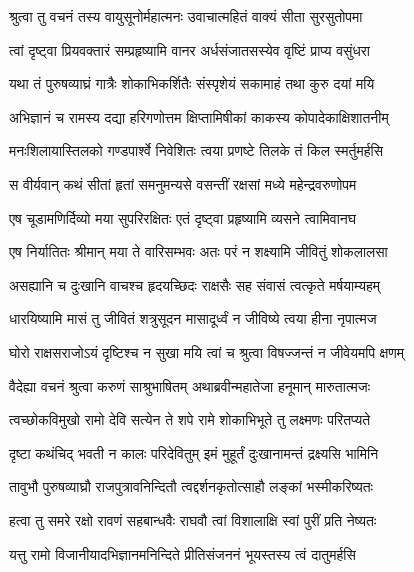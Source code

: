 
\twolineshloka
{श्रुत्वा तु वचनं तस्य वायुसूनोर्महात्मनः}
{उवाचात्महितं वाक्यं सीता सुरसुतोपमा} %

\twolineshloka
{त्वां दृष्ट्वा प्रियवक्तारं सम्प्रहृष्यामि वानर}
{अर्धसंजातसस्येव वृष्टिं प्राप्य वसुंधरा} %

\twolineshloka
{यथा तं पुरुषव्याघ्रं गात्रैः शोकाभिकर्शितैः}
{संस्पृशेयं सकामाहं तथा कुरु दयां मयि} %

\twolineshloka
{अभिज्ञानं च रामस्य दद्या हरिगणोत्तम}
{क्षिप्तामिषीकां काकस्य कोपादेकाक्षिशातनीम्} %

\twolineshloka
{मनःशिलायास्तिलको गण्डपार्श्वे निवेशितः}
{त्वया प्रणष्टे तिलके तं किल स्मर्तुमर्हसि} %

\twolineshloka
{स वीर्यवान् कथं सीतां हृतां समनुमन्यसे}
{वसन्तीं रक्षसां मध्ये महेन्द्रवरुणोपम} %

\twolineshloka
{एष चूडामणिर्दिव्यो मया सुपरिरक्षितः}
{एतं दृष्ट्वा प्रहृष्यामि व्यसने त्वामिवानघ} %

\twolineshloka
{एष निर्यातितः श्रीमान् मया ते वारिसम्भवः}
{अतः परं न शक्ष्यामि जीवितुं शोकलालसा} %

\twolineshloka
{असह्यानि च दुःखानि वाचश्च हृदयच्छिदः}
{राक्षसैः सह संवासं त्वत्कृते मर्षयाम्यहम्} %

\twolineshloka
{धारयिष्यामि मासं तु जीवितं शत्रुसूदन}
{मासादूर्ध्वं न जीविष्ये त्वया हीना नृपात्मज} %

\twolineshloka
{घोरो राक्षसराजोऽयं दृष्टिश्च न सुखा मयि}
{त्वां च श्रुत्वा विषज्जन्तं न जीवेयमपि क्षणम्} %

\twolineshloka
{वैदेह्या वचनं श्रुत्वा करुणं साश्रुभाषितम्}
{अथाब्रवीन्महातेजा हनूमान् मारुतात्मजः} %

\twolineshloka
{त्वच्छोकविमुखो रामो देवि सत्येन ते शपे}
{रामे शोकाभिभूते तु लक्ष्मणः परितप्यते} %

\twolineshloka
{दृष्टा कथंचिद् भवती न कालः परिदेवितुम्}
{इमं मुहूर्तं दुःखानामन्तं द्रक्ष्यसि भामिनि} %

\twolineshloka
{तावुभौ पुरुषव्याघ्रौ राजपुत्रावनिन्दितौ}
{त्वद्दर्शनकृतोत्साहौ लङ्कां भस्मीकरिष्यतः} %

\twolineshloka
{हत्वा तु समरे रक्षो रावणं सहबान्धवैः}
{राघवौ त्वां विशालाक्षि स्वां पुरीं प्रति नेष्यतः} %

\twolineshloka
{यत्तु रामो विजानीयादभिज्ञानमनिन्दिते}
{प्रीतिसंजननं भूयस्तस्य त्वं दातुमर्हसि} %

